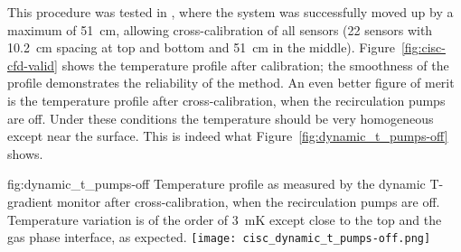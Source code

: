 

This procedure was tested in , where the system was successfully moved up by a maximum of \SI{51}{cm}, allowing cross-calibration of all sensors (22 sensors with \SI{10.2}{cm} spacing at top and bottom and \SI{51}{cm} in the middle). 
Figure~\ref{fig:cisc-cfd-valid} shows the temperature profile after calibration; the smoothness of the profile demonstrates the reliability of the method. An even better figure of merit is %
the temperature profile after cross-calibration, when the recirculation pumps are off. Under these conditions the  temperature should be very homogeneous except near the surface. This is indeed what %
Figure~\ref{fig:dynamic_t_pumps-off} shows.  

\begin{dunefigure}{fig:dynamic_t_pumps-off}
  {Temperature profile as measured by the dynamic T-gradient monitor after cross-calibration, when the recirculation pumps are off. Temperature variation is of the order of \SI{3}{mK} except close to the top and the gas phase interface, as expected.}
  \texttt{[image: cisc\_dynamic\_t\_pumps-off.png]}%
\end{dunefigure}


